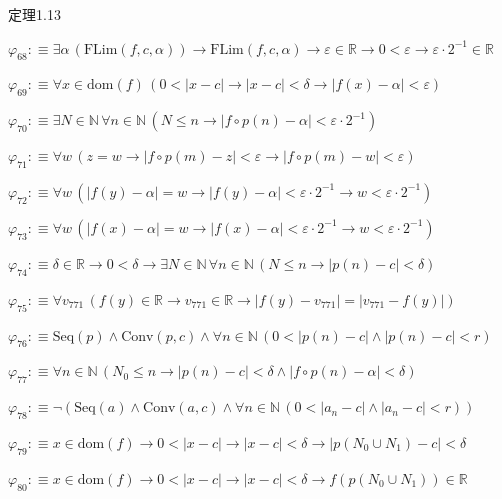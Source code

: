 \begin{fullproof}{定理1.13}
\begin{abbrevlist}
\item $\varphi_{68} :\equiv \exists \alpha\,(\mathrm{FLim}(f,c,\alpha)) \to \mathrm{FLim}(f,c,\alpha) \to \varepsilon \in \mathbb{R} \to 0 < \varepsilon \to \varepsilon \cdot 2^{-1} \in \mathbb{R}$
\item $\varphi_{69} :\equiv \forall x \in \mathrm{dom}(f)\,(0 < \lvert x - c \rvert \to \lvert x - c \rvert < \delta \to \lvert f(x) - \alpha \rvert < \varepsilon)$
\item $\varphi_{70} :\equiv \exists N \in \mathbb{N}\,\forall n \in \mathbb{N}\,(N \leq n \to \lvert f \circ p(n) - \alpha \rvert < \varepsilon \cdot 2^{-1})$
\item $\varphi_{71} :\equiv \forall w\,(z = w \to \lvert f \circ p(m) - z \rvert < \varepsilon \to \lvert f \circ p(m) - w \rvert < \varepsilon)$
\item $\varphi_{72} :\equiv \forall w\,(\lvert f(y) - \alpha \rvert = w \to \lvert f(y) - \alpha \rvert < \varepsilon \cdot 2^{-1} \to w < \varepsilon \cdot 2^{-1})$
\item $\varphi_{73} :\equiv \forall w\,(\lvert f(x) - \alpha \rvert = w \to \lvert f(x) - \alpha \rvert < \varepsilon \cdot 2^{-1} \to w < \varepsilon \cdot 2^{-1})$
\item $\varphi_{74} :\equiv \delta \in \mathbb{R} \to 0 < \delta \to \exists N \in \mathbb{N}\,\forall n \in \mathbb{N}\,(N \leq n \to \lvert p(n) - c \rvert < \delta)$
\item $\varphi_{75} :\equiv \forall v_{771}\,(f(y) \in \mathbb{R} \to v_{771} \in \mathbb{R} \to \lvert f(y) - v_{771} \rvert = \lvert v_{771} - f(y) \rvert)$
\item $\varphi_{76} :\equiv \mathrm{Seq}(p) \land \mathrm{Conv}(p,c) \land \forall n \in \mathbb{N}\,(0 < \lvert p(n) - c \rvert \land \lvert p(n) - c \rvert < r)$
\item $\varphi_{77} :\equiv \forall n \in \mathbb{N}\,(N_{0} \leq n \to \lvert p(n) - c \rvert < \delta \land \lvert f \circ p(n) - \alpha \rvert < \delta)$
\item $\varphi_{78} :\equiv \neg (\mathrm{Seq}(a) \land \mathrm{Conv}(a,c) \land \forall n \in \mathbb{N}\,(0 < \lvert a_{n} - c \rvert \land \lvert a_{n} - c \rvert < r))$
\item $\varphi_{79} :\equiv x \in \mathrm{dom}(f) \to 0 < \lvert x - c \rvert \to \lvert x - c \rvert < \delta \to \lvert p(N_{0} \cup N_{1}) - c \rvert < \delta$
\item $\varphi_{80} :\equiv x \in \mathrm{dom}(f) \to 0 < \lvert x - c \rvert \to \lvert x - c \rvert < \delta \to f(p(N_{0} \cup N_{1})) \in \mathbb{R}$

\end{abbrevlist}
\end{fullproof}

